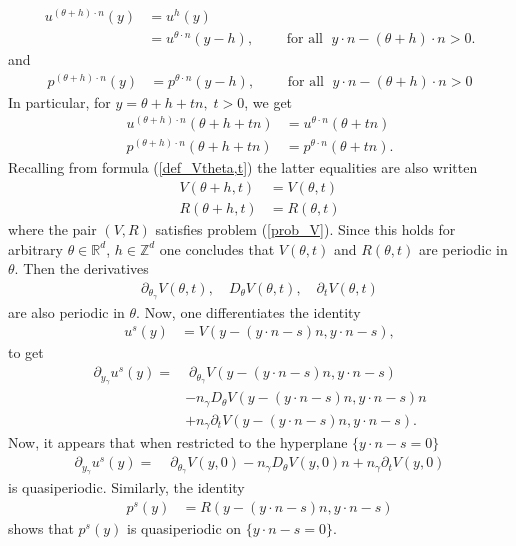 \documentclass[11pt, reqno]{amsart}
\theoremstyle{definition}
\theoremstyle{remark}
\numberwithin{equation}{section}
\begin{document}
\begin{appendices}
\begin{align*}
	u^{(\theta+h)\cdot n}(y)&= u^h(y)\\
	&=u^{\theta\cdot n}(y-h),\qquad \mbox{ for all }\;  y\cdot n - (\theta+ h)\cdot n>0.
\end{align*}
and 
\begin{align*}
	p^{(\theta+h)\cdot n}(y)
	&=p^{\theta\cdot n}(y-h),\qquad \mbox{ for all }\;  y\cdot n - (\theta+ h)\cdot n>0
\end{align*}
In particular, for $y=\theta+h+tn, \; t>0$,
we get 
\begin{align*}
	u^{(\theta+h)\cdot n}(\theta+h+tn)&=u^{\theta\cdot n}(\theta+tn)\\
		p^{(\theta+h)\cdot n}(\theta+h+tn)&=p^{\theta\cdot n}(\theta+tn).
\end{align*}
Recalling from formula (\ref{def_Vtheta,t}) 	the latter equalities are also written 	
		 \begin{align*}
			V(\theta+h,t)&=V(\theta,t)\\
			R(\theta+h,t)&=R(\theta,t)	
		\end{align*}
		where the pair $(V,R)$ satisfies problem (\ref{prob_V}).	Since this holds for arbitrary $\theta\in\mathbb{R}^d$, $h\in\mathbb{Z}^d$
one concludes  that $V(\theta,t)$ and  $R(\theta,t)$ are periodic in  $\theta$. Then the derivatives
\begin{align*}
	\partial_{\theta_\gamma} V(\theta,t),\quad   D_\theta V(\theta,t) ,\quad \partial_t V(\theta,t)
\end{align*} 	
are also periodic in $\theta$. Now, one differentiates the  identity  
\begin{align*}
	u^s(y)&=V(y-(y\cdot n- s)n,y\cdot n- s),
\end{align*} 		
to get
\begin{align*}
	\partial_{y_\gamma} u^s(y)=&\; \partial_{\theta_\gamma} V(y-(y\cdot n- s)n,y\cdot n- s)\\
	&-n_\gamma D_\theta V(y-(y\cdot n- s)n,y\cdot n- s) n\\
	&+n_\gamma \partial_t V(y-(y\cdot n- s)n,y\cdot n- s) .
\end{align*} 
Now, it appears that when restricted to the hyperplane $\{y\cdot n- s=0\}$	
\begin{align*}
	\partial_{y_\gamma} u^s(y)=&\; \partial_{\theta_\gamma} V(y,0)-n_\gamma D_\theta V(y,0) n+n_\gamma \partial_t V(y,0) 
\end{align*}
is quasiperiodic. Similarly, the identity 
\begin{align*}
	p^s(y)&=R(y-(y\cdot n- s)n,y\cdot n- s)
\end{align*} 	
shows that $p^s(y)$ is quasiperiodic on $\{y\cdot n- s=0\}$.
		
	\end{appendices}
	
\end{document}

